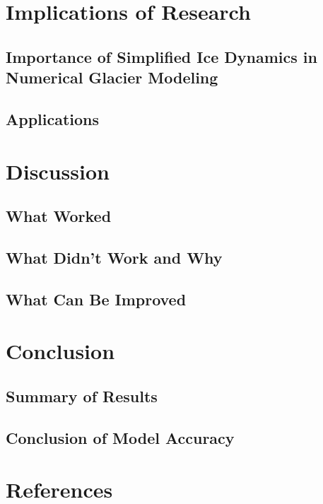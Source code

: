 \documentclass{article}
\begin{document}
\section{Implications of Research}
\subsection{Importance of Simplified Ice Dynamics in Numerical Glacier Modeling}
\subsection{Applications}

\section{Discussion}
\subsection{What Worked}
\subsection{What Didn’t Work and Why}
\subsection{What Can Be Improved}

\section{Conclusion}
\subsection{Summary of Results}
\subsection{Conclusion of Model Accuracy}

\section{References}
\end{document}
